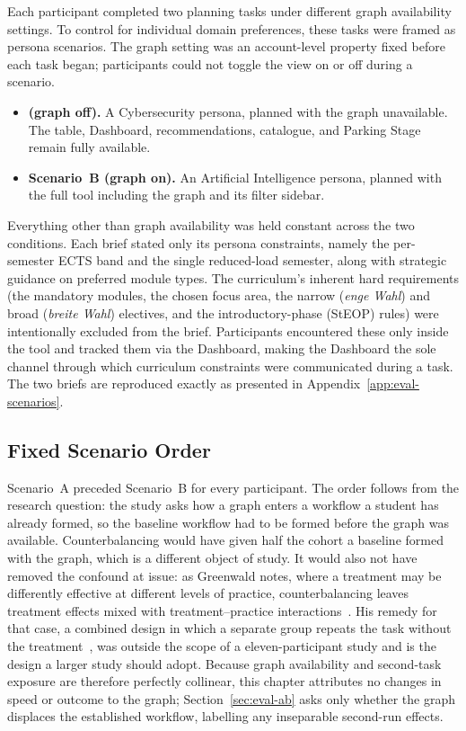 Each participant completed two planning tasks under different graph availability settings. To control for individual domain preferences, these tasks were framed as persona scenarios. The graph setting was an account-level property fixed before each task began; participants could not toggle the view on or off during a scenario.

\begin{itemize}
    \item \textbf{ (graph off).} A Cybersecurity persona, planned with the graph unavailable. The table, Dashboard, recommendations, catalogue, and Parking Stage remain fully available.
    \item \textbf{Scenario~B (graph on).} An Artificial Intelligence persona, planned with the full tool including the graph and its filter sidebar.
\end{itemize}

Everything other than graph availability was held constant across the two conditions. Each brief stated only its persona constraints, namely the per-semester ECTS band and the single reduced-load semester, along with strategic guidance on preferred module types. The curriculum's inherent hard requirements (the mandatory modules, the chosen focus area, the narrow (\emph{enge Wahl}) and broad (\emph{breite Wahl}) electives, and the introductory-phase (StEOP) rules) were intentionally excluded from the brief. Participants encountered these only inside the tool and tracked them via the Dashboard, making the Dashboard the sole channel through which curriculum constraints were communicated during a task. The two briefs are reproduced exactly as presented in Appendix~\ref{app:eval-scenarios}.

\subsection{Fixed Scenario Order}
\label{sec:eval-order}

Scenario~A preceded Scenario~B for every participant. The order follows from the research question: the study asks how a graph enters a workflow a student has already formed, so the baseline workflow had to be formed before the graph was available. Counterbalancing would have given half the cohort a baseline formed with the graph, which is a different object of study. It would also not have removed the confound at issue: as Greenwald notes, where a treatment may be differently effective at different levels of practice, counterbalancing leaves treatment effects mixed with treatment--practice interactions~\cite[p.~316]{greenwald1976within}. His remedy for that case, a combined design in which a separate group repeats the task without the treatment~\cite[p.~316]{greenwald1976within}, was outside the scope of a eleven-participant study and is the design a larger study should adopt. Because graph availability and second-task exposure are therefore perfectly collinear, this chapter attributes no changes in speed or outcome to the graph; Section~\ref{sec:eval-ab} asks only whether the graph displaces the established workflow, labelling any inseparable second-run effects.

